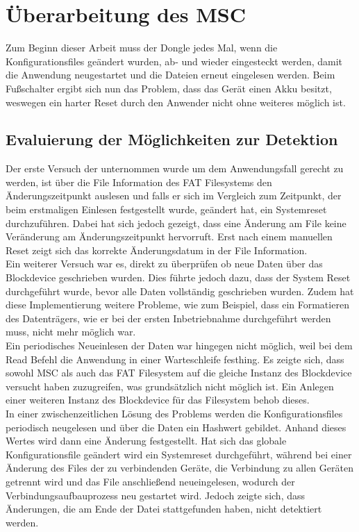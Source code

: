 \section{Überarbeitung des MSC}
Zum Beginn dieser Arbeit muss der Dongle jedes Mal, wenn die Konfigurationsfiles geändert wurden, ab- und wieder eingesteckt werden, damit die Anwendung neugestartet und die Dateien erneut eingelesen werden. Beim Fußschalter ergibt sich nun das Problem, dass das Gerät einen Akku besitzt, weswegen ein harter Reset durch den Anwender nicht ohne weiteres möglich ist.

\subsection{Evaluierung der Möglichkeiten zur Detektion}
Der erste Versuch der unternommen wurde um dem Anwendungsfall gerecht zu werden, ist über die File Information des \ac{FAT} Filesystems den Änderungszeitpunkt auslesen und falls er sich im Vergleich zum Zeitpunkt, der beim erstmaligen Einlesen festgestellt wurde, geändert hat, ein Systemreset durchzuführen. Dabei hat sich jedoch gezeigt, dass eine Änderung am File keine Veränderung am Änderungszeitpunkt hervorruft. Erst nach einem manuellen Reset zeigt sich das korrekte Änderungsdatum in der File Information. \\
Ein weiterer Versuch war es, direkt zu überprüfen ob neue Daten über das Blockdevice geschrieben wurden. Dies führte jedoch dazu, dass der System Reset durchgeführt wurde, bevor alle Daten vollständig geschrieben wurden. Zudem hat diese Implementierung weitere Probleme, wie zum Beispiel, dass ein Formatieren des Datenträgers, wie er bei der ersten Inbetriebnahme durchgeführt werden muss, nicht mehr möglich war. \\
Ein periodisches Neueinlesen der Daten war hingegen nicht möglich, weil bei dem Read Befehl die Anwendung in einer Warteschleife festhing. Es zeigte sich, dass sowohl \ac{MSC} als auch das \ac{FAT} Filesystem auf die gleiche Instanz des Blockdevice versucht haben zuzugreifen, was grundsätzlich nicht möglich ist. Ein Anlegen einer weiteren Instanz des Blockdevice für das Filesystem behob dieses. \\
In einer zwischenzeitlichen Lösung des Problems werden die Konfigurationsfiles periodisch neugelesen und über die Daten ein Hashwert gebildet. Anhand dieses Wertes wird dann eine Änderung festgestellt. Hat sich das globale Konfigurationsfile geändert wird ein Systemreset durchgeführt, während bei einer Änderung des Files der zu verbindenden Geräte, die Verbindung zu allen Geräten getrennt wird und das File anschließend neueingelesen, wodurch der Verbindungsaufbauprozess neu gestartet wird. Jedoch zeigte sich, dass Änderungen, die am Ende der Datei stattgefunden haben, nicht detektiert werden.

